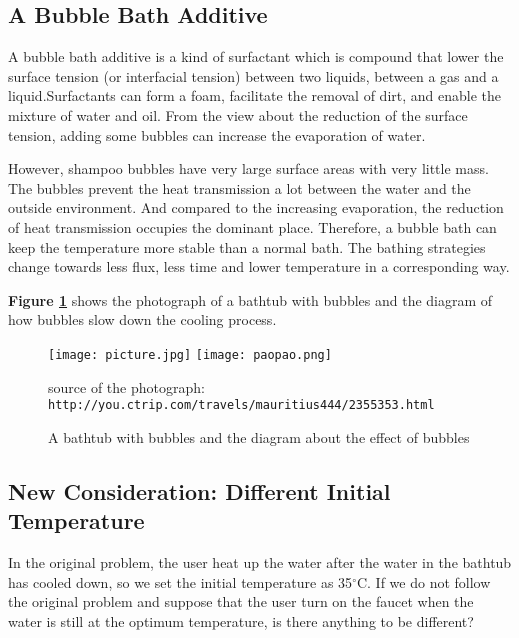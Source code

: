 \documentclass{HZNUMCM}
\begin{document}
\subsection{A Bubble Bath Additive}
A bubble bath additive is a kind of surfactant which is compound that lower the surface tension (or
interfacial tension) between two liquids, between a gas and a liquid.Surfactants can form a foam,
facilitate the removal of dirt, and enable the mixture of water and oil. From the view about the
reduction of the surface tension, adding some bubbles can increase the evaporation of water.

However, shampoo bubbles have very large surface areas with very little mass. The bubbles prevent
the heat transmission a lot between the water and the outside environment. And compared to the
increasing evaporation, the reduction of heat transmission occupies the dominant place. Therefore, a
bubble bath can keep the temperature more stable than a normal bath. The bathing strategies change
towards less flux, less time and lower temperature in a corresponding way.

\textbf{Figure \ref{bubble}} shows the photograph of a bathtub with bubbles and the diagram of how
bubbles slow down the cooling process.
\begin{figure}[!htbp]
    \small
    \centering
    \texttt{[image: picture.jpg]}
    \texttt{[image: paopao.png]}
    \caption{A bathtub with bubbles and the diagram about the effect of bubbles}\label{bubble}
    source of the photograph: \texttt{http://you.ctrip.com/travels/mauritius444/2355353.html}
\end{figure}

\subsection{New Consideration: Different Initial Temperature}
In the original problem, the user heat up the water after the water in the bathtub has cooled down,
so we set the initial temperature as 35$^\circ$C. If we do not follow the original problem and
suppose that the user turn on the faucet when the water is still at the optimum temperature, is
there anything to be different?
\end{document}
